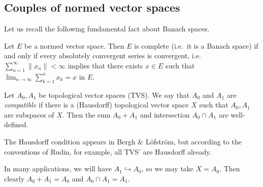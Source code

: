 \subsection{Couples of normed vector spaces}
Let us recall the following fundamental fact about Banach spaces.

\begin{lemma}
\label{lem:abs-converge}
Let $E$ be a normed vector space. Then $E$ is complete (i.e.\ it is a Banach space) if and only if every absolutely convergent series is convergent, i.e.\ $\sum_{n=1}^\infty \|x_n\|<\infty$ implies that there exists $x\in E$ such that $\lim_{n\to\infty}\sum_{k=1}^n x_k = x$ in $E$.
\end{lemma}

\begin{definition}
Let $A_0, A_1$ be topological vector spaces (TVS). We say that $A_0$ and $A_1$ are \emph{compatible} if there is a (Hausdorff) topological vector space $X$ such that $A_0, A_1$ are subspaces of $X$. Then the sum $A_0+A_1$ and intersection $A_0\cap A_1$ are well-defined.
\end{definition}

\begin{remark}
The Hausdorff condition appears in Bergh \& L\"{o}fstr\"{o}m, but according to the conventions of Rudin, for example, all TVS' are Hausdorff already.

In many applications, we will have $A_1 \hookrightarrow A_0$, so we may take $X=A_0$. Then clearly $A_0+A_1=A_0$ and $A_0\cap A_1=A_1$.
\end{remark}

